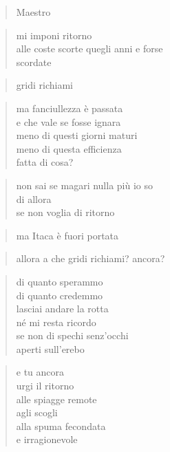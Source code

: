 
	\begin{verse}
		Maestro
	\end{verse}

	\begin{verse}
		mi imponi ritorno\\
		alle coste scorte quegli anni e forse\\
		scordate
	\end{verse}

	\begin{verse}
		gridi richiami
	\end{verse}

	\begin{verse}
		ma fanciullezza è passata\\
		e che vale se fosse ignara\\
		meno di questi giorni maturi\\
		meno di questa efficienza\\
		fatta di cosa?
	\end{verse}

	\begin{verse}
		non sai se magari nulla più io so\\
		di allora\\
		se non voglia di ritorno
	\end{verse}

	\begin{verse}
		ma Itaca è fuori portata
	\end{verse}

	\begin{verse}
		allora a che gridi richiami? ancora?
	\end{verse}

	\begin{verse}
		di quanto sperammo\\
		di quanto credemmo\\
		lasciai andare la rotta\\
		né mi resta ricordo\\
		se non di spechi senz’occhi\\
		aperti sull’erebo
	\end{verse}

	\begin{verse}
		e tu ancora\\
		urgi il ritorno\\
		alle spiagge remote\\
		agli scogli\\
		alla spuma fecondata\\
		e irragionevole
	\end{verse}

